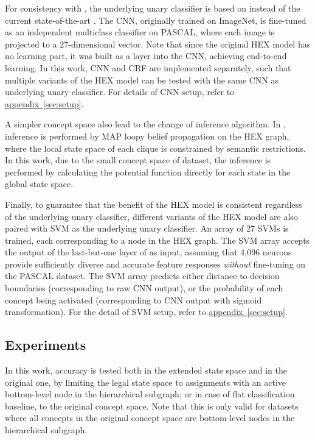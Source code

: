 \documentclass[11pt,a4paper]{article}
\begin{document}
For consistency with \cite{deng2014large}, the underlying unary classifier is based on \cite{krizhevsky2012imagenet} instead of the current state-of-the-art \cite{simonyan2014very}. The CNN, originally trained on ImageNet, is fine-tuned as an independent multiclass classifier on PASCAL, where each image is projected to a 27-dimensional vector. Note that since the original HEX model has no learning part, it was built as a layer into the CNN, achieving end-to-end learning. In this work, CNN and CRF are implemented separately, such that multiple variants of the HEX model can be tested with the same CNN as underlying unary classifier. For details of CNN setup, refer to \hyperref[sec:setup]{appendix~\ref{sec:setup}}.

A simpler concept space also lead to the change of inference algorithm. In \cite{deng2014large}, inference is performed by MAP loopy belief propagation on the HEX graph, where the local state space of each clique is constrained by semantic restrictions. In this work, due to the small concept space of dataset, the inference is performed by calculating the potential function directly for each state in the global state space.

Finally, to guarantee that the benefit of the HEX model is consistent regardless of the underlying unary classifier, different variants of the HEX model are also paired with SVM as the underlying unary classifier. An array of 27 SVMs is trained, each corresponding to a node in the HEX graph. The SVM array accepts the output of the last-but-one layer of \cite{krizhevsky2012imagenet} as input, assuming that 4,096 neurons provide sufficiently diverse and accurate feature responses \emph{without} fine-tuning on the PASCAL dataset. The SVM array predicts either distance to decision boundaries (corresponding to raw CNN output), or the probability of each concept being activated (corresponding to CNN output with sigmoid transformation). For the detail of SVM setup, refer to \hyperref[sec:setup]{appendix~\ref{sec:setup}}.

\subsection{Experiments}
\label{sec:exp1}

In this work, accuracy is tested both in the extended state space and in the original one, by limiting the legal state space to assignments with an active bottom-level node in the hierarchical subgraph; or in case of flat classification baseline, to the original concept space. Note that this is only valid for datasets where all concepts in the original concept space are bottom-level nodes in the hierarchical subgraph.
\end{document}
